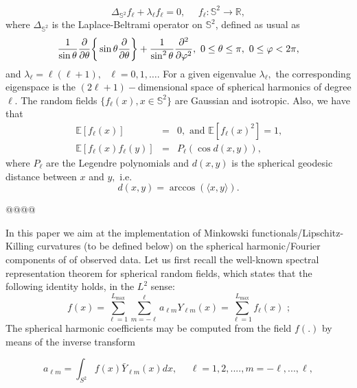 \documentclass[aps,prd,showpacs,superscriptaddress,groupedaddress]{revtex4-1}  %
\begin{document}
\begin{equation*}
\Delta _{\mathbb{S}^{2}}f_{\ell }+\lambda _{\ell }f_{\ell }=0,\mbox{ }\mbox{
}\mbox{ }f_{\ell }:\mathbb{S}^{2}\rightarrow \mathbb{R},
\end{equation*}%
where $\Delta _{\mathbb{S}^{2}}$ is the Laplace-Beltrami operator on $%
\mathbb{S}^{2}$, defined as usual as
\begin{equation*}
\dfrac{1}{\sin \theta }\dfrac{\partial }{\partial \theta }\bigg\{\sin \theta 
\dfrac{\partial }{\partial \theta }\bigg\}+\dfrac{1}{\sin ^{2}\theta }\dfrac{%
\partial ^{2}}{\partial \varphi ^{2}},\mbox{ }0\leq \theta \leq \pi ,\mbox{ }%
0\leq \varphi < 2\pi ,
\end{equation*}%
and $\lambda _{\ell }=\ell (\ell +1),\mbox{ }\ell =0,1,\dots $. For a given
eigenvalue $\lambda _{\ell },$ the corresponding eigenspace is the $(2\ell
+1)-$dimensional space of spherical harmonics of degree $\ell .$
The random fields $\{f_{\ell }(x),x\in \mathbb{S}^{2}\}
$ are Gaussian and isotropic. %
Also, we have that 
\begin{eqnarray*}
	\mathbb{E}[f_{\ell }(x)] &=&0,\mbox{ and }\mathbb{E}[f_{\ell }(x)^{2}]=1%
	\text{,} \\
	\mathbb{E}[f_{\ell }(x)f_{\ell }(y)] &=&P_{\ell }(\cos d(x,y)),
\end{eqnarray*}%
where $P_{\ell }$ are the Legendre polynomials and $d(x,y)$ is the spherical
geodesic distance between $x$ and $y,$ i.e. 
\begin{equation*}
d(x,y)=\arccos (\langle x,y\rangle ).
\end{equation*}%




@@@@

In this paper we aim at the implementation of Minkowski functionals/Lipschitz-Killing curvatures (to be defined below) on the spherical harmonic/Fourier components of of observed data. Let us first recall the well-known spectral representation theorem for spherical random fields, which states that the following identity holds, in the $L^2$ sense:
\begin{equation}
f(x)=\sum_{\ell =1}^{L_{\max }}\sum_{m=-\ell }^{\ell }a_{\ell m}Y_{\ell
m}(x)=\sum_{\ell =1}^{L_{\max }}f_{\ell }(x)\text{ ;}  \label{specrap}
\end{equation}%
The spherical harmonic coefficients may be computed from the field $f(.)$ by means of the inverse transform

\begin{equation}
a_{\ell m}= \int_{S^2} f(x) \bar{Y}_{\ell
m}(x)dx, \text{ } \text{ } \ell =1,2,...., m=-\ell,...,\ell ,   \label{specrap2}
\end{equation}%
\end{document}
